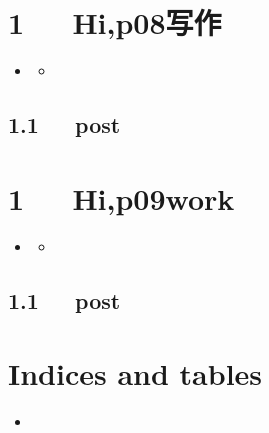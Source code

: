 \documentclass[letterpaper,12pt,english]{sphinxmanual}
\begin{document}
\chapter{1   Hi,p08写作}
\label{\detokenize{p08_u5199_u4f5c/Hello_uff0cp08_u5199_u4f5c:hi-p08}}\label{\detokenize{p08_u5199_u4f5c/Hello_uff0cp08_u5199_u4f5c::doc}}
\begin{sphinxShadowBox}
\begin{itemize}
\item {} 
\label{\detokenize{p08_u5199_u4f5c/Hello_uff0cp08_u5199_u4f5c:id2}}{\hyperref[\detokenize{p08_u5199_u4f5c/Hello_uff0cp08_u5199_u4f5c:hi-p08}]{}}
\begin{itemize}
\item {} 
\label{\detokenize{p08_u5199_u4f5c/Hello_uff0cp08_u5199_u4f5c:id3}}{\hyperref[\detokenize{p08_u5199_u4f5c/Hello_uff0cp08_u5199_u4f5c:post}]{}}

\end{itemize}

\end{itemize}
\end{sphinxShadowBox}


\section{1.1   post}
\label{\detokenize{p08_u5199_u4f5c/Hello_uff0cp08_u5199_u4f5c:post}}

\chapter{1   Hi,p09work}
\label{\detokenize{p09work/Hello_uff0cp09work:hi-p09work}}\label{\detokenize{p09work/Hello_uff0cp09work::doc}}
\begin{sphinxShadowBox}
\begin{itemize}
\item {} 
\label{\detokenize{p09work/Hello_uff0cp09work:id2}}{\hyperref[\detokenize{p09work/Hello_uff0cp09work:hi-p09work}]{}}
\begin{itemize}
\item {} 
\label{\detokenize{p09work/Hello_uff0cp09work:id3}}{\hyperref[\detokenize{p09work/Hello_uff0cp09work:post}]{}}

\end{itemize}

\end{itemize}
\end{sphinxShadowBox}


\section{1.1   post}
\label{\detokenize{p09work/Hello_uff0cp09work:post}}

\chapter{Indices and tables}
\label{\detokenize{index:indices-and-tables}}\begin{itemize}
\item {} 

\end{itemize}



\renewcommand{\indexname}{索引}
\printindex
\end{document}
